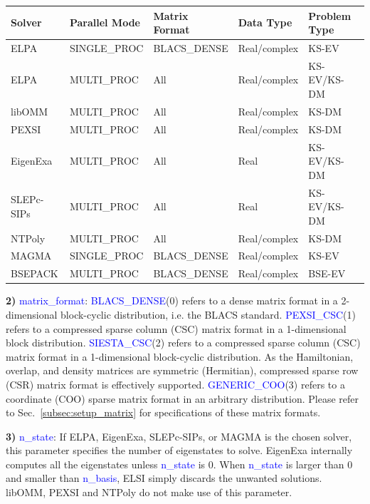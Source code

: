 \documentclass{report}
\newcommand{\tcb}[1]{\textcolor{blue}{#1}}
\begin{document}
\begin{tabular}[]{|p{30mm}|p{30mm}|p{30mm}|p{30mm}|p{30mm}|}
\hline
\multicolumn{1}{|l|}{\textbf{Solver}} & \multicolumn{1}{l|}{\textbf{Parallel Mode}} & \multicolumn{1}{l|}{\textbf{Matrix Format}} & \multicolumn{1}{l|}{\textbf{Data Type}} & \multicolumn{1}{l|}{\textbf{Problem Type}}\\
\hline
ELPA       & SINGLE\_PROC & BLACS\_DENSE & Real/complex & KS-EV\\
\hline
ELPA       & MULTI\_PROC  & All          & Real/complex & KS-EV/KS-DM\\
\hline
libOMM     & MULTI\_PROC  & All          & Real/complex & KS-DM\\
\hline
PEXSI      & MULTI\_PROC  & All          & Real/complex & KS-DM\\
\hline
EigenExa   & MULTI\_PROC  & All          & Real         & KS-EV/KS-DM\\
\hline
SLEPc-SIPs & MULTI\_PROC  & All          & Real         & KS-EV/KS-DM\\
\hline
NTPoly     & MULTI\_PROC  & All          & Real/complex & KS-DM\\
\hline
MAGMA      & SINGLE\_PROC & BLACS\_DENSE & Real/complex & KS-EV\\
\hline
BSEPACK    & MULTI\_PROC  & BLACS\_DENSE & Real/complex & BSE-EV\\
\hline
\end{tabular}

\textbf{2)} \tcb{matrix\_format}: \tcb{BLACS\_DENSE}(0) refers to a dense matrix format in a 2-dimensional block-cyclic distribution, i.e. the BLACS standard. \tcb{PEXSI\_CSC}(1) refers to a compressed sparse column (CSC) matrix format in a 1-dimensional block distribution. \tcb{SIESTA\_CSC}(2) refers to a compressed sparse column (CSC) matrix format in a 1-dimensional block-cyclic distribution. As the Hamiltonian, overlap, and density matrices are symmetric (Hermitian), compressed sparse row (CSR) matrix format is effectively supported. \tcb{GENERIC\_COO}(3) refers to a coordinate (COO) sparse matrix format in an arbitrary distribution. Please refer to Sec.~\ref{subsec:setup_matrix} for specifications of these matrix formats.

\textbf{3)} \tcb{n\_state}: If ELPA, EigenExa, SLEPc-SIPs, or MAGMA is the chosen solver, this parameter specifies the number of eigenstates to solve. EigenExa internally computes all the eigenstates unless \tcb{n\_state} is 0. When \tcb{n\_state} is larger than 0 and smaller than \tcb{n\_basis}, ELSI simply discards the unwanted solutions. libOMM, PEXSI and NTPoly do not make use of this parameter.
\end{document}
